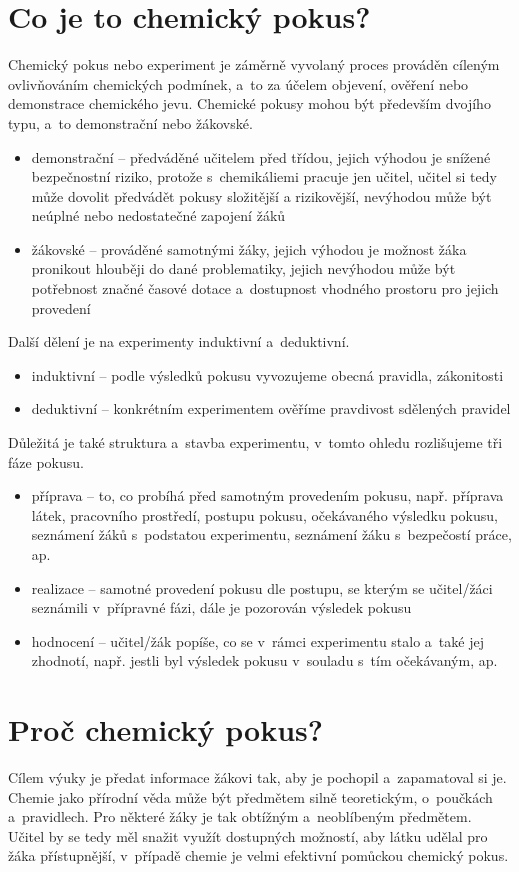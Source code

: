 
\section{Co je to chemický pokus?}
Chemický pokus nebo experiment je záměrně vyvolaný proces prováděn cíleným ovlivňováním chemických podmínek, a~to za účelem objevení, ověření nebo demonstrace chemického jevu. Chemické pokusy mohou být především dvojího typu, a~to demonstrační nebo žákovské. \cite{badani}
\begin{itemize}
  \item demonstrační -- předváděné učitelem před třídou, jejich výhodou je snížené bezpečnostní riziko, protože s~chemikáliemi pracuje jen učitel, učitel si tedy může dovolit předvádět pokusy složitější a rizikovější, nevýhodou může být neúplné nebo nedostatečné zapojení žáků
  \item žákovské -- prováděné samotnými žáky, jejich výhodou je možnost žáka pronikout hlouběji do dané problematiky, jejich nevýhodou může být potřebnost značné časové dotace a~dostupnost vhodného prostoru pro jejich provedení
\end{itemize}
Další dělení je na experimenty induktivní a~deduktivní. \cite{badani}
\begin{itemize}
  \item induktivní -- podle výsledků pokusu vyvozujeme obecná pravidla, zákonitosti
  \item deduktivní -- konkrétním experimentem ověříme pravdivost sdělených pravidel
\end{itemize}
Důležitá je také struktura a~stavba experimentu, v~tomto ohledu rozlišujeme tři fáze pokusu. \cite{badani}
\begin{itemize}
  \item příprava -- to, co probíhá před samotným provedením pokusu, např. příprava látek, pracovního prostředí, postupu pokusu, očekávaného výsledku pokusu, seznámení žáků s~podstatou experimentu, seznámení žáku s~bezpečostí práce, ap.
  \item realizace -- samotné provedení pokusu dle postupu, se kterým se učitel/žáci seznámili v~přípravné fázi, dále je pozorován výsledek pokusu
  \item hodnocení -- učitel/žák popíše, co se v~rámci experimentu stalo a~také jej zhodnotí, např. jestli byl výsledek pokusu v~souladu s~tím očekávaným, ap.
\end{itemize}

\section{Proč chemický pokus?}
Cílem výuky je předat informace žákovi tak, aby je pochopil a~zapamatoval si je. Chemie jako přírodní věda může být předmětem silně teoretickým, o~poučkách a~pravidlech. Pro některé žáky je tak obtížným a~neoblíbeným předmětem. \cite{oblibenost} Učitel by se tedy měl snažit využít dostupných možností, aby látku udělal pro žáka přístupnější, v~případě chemie je velmi efektivní pomůckou chemický pokus.

